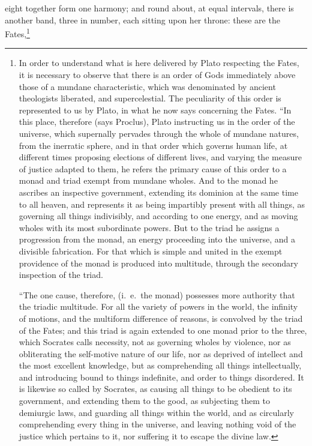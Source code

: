 \documentclass[12pt]{article}
\begin{document}
eight together form one harmony; and round about, at equal intervals, there is
another band, three in number, each sitting upon her throne: these are the
Fates,\footnote{In order to understand what is here delivered by Plato
respecting the Fates, it is necessary to observe that there is an order of Gods
immediately above those of a mundane characteristic, which was denominated by
ancient theologists liberated, and supercelestial. The peculiarity of this
order is represented to us by Plato, in what he now says concerning the Fates.
``In this place, therefore (says Proclus), Plato instructing us in the order of
the universe, which supernally pervades through the whole of mundane natures,
from the inerratic sphere, and in that order which governs human life, at
different times proposing elections of different lives, and varying the measure
of justice adapted to them, he refers the primary cause of this order to a
monad and triad exempt from mundane wholes. And to the monad he ascribes an
inspective government, extending its dominion at the same time to all heaven,
and represents it as being impartibly present with all things, as governing all
things indivisibly, and according to one energy, and as moving wholes with its
most subordinate powers. But to the triad he assigns a progression from the
monad, an energy proceeding into the universe, and a divisible fabrication. For
that which is simple and united in the exempt providence of the monad is
produced into multitude, through the secondary inspection of the triad.

``The one cause, therefore, (i.~e.~the monad) possesses more authority that the
triadic multitude. For all the variety of powers in the world, the infinity of
motions, and the multiform difference of reasons, is convolved by the triad of
the Fates; and this triad is again extended to one monad prior to the three,
which Socrates calls necessity, not as governing wholes by violence, nor as
obliterating the self-motive nature of our life, nor as deprived of intellect
and the most excellent knowledge, but as comprehending all things
intellectually, and introducing bound to things indefinite, and order to things
disordered. It is likewise so called by Socrates, as causing all things to be
obedient to its government, and extending them to the good, as subjecting them
to demiurgic laws, and guarding all things within the world, and as circularly
comprehending every thing in the universe, and leaving nothing void of the
justice which pertains to it, nor suffering it to escape the divine law.

}
\end{document}
